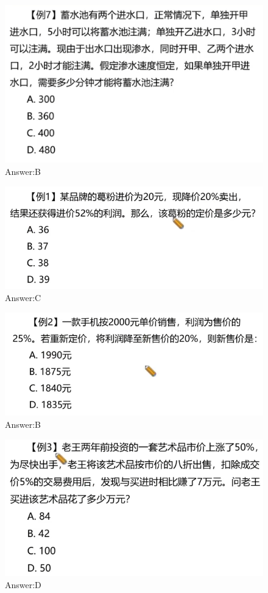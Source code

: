 \documentclass{article}
\numberwithin{equation}{section}						%
\numberwithin{figure}{section}							%
\begin{document}
\begin{sloppypar}
\begin{figure}[H]
     \centering
     \includegraphics[width=0.6\linewidth]{274.png}
		\caption{Answer:B}
\end{figure}

\begin{figure}[H]
     \centering
     \includegraphics[width=0.6\linewidth]{275.png}
		\caption{Answer:C}
\end{figure}


\begin{figure}[H]
     \centering
     \includegraphics[width=0.6\linewidth]{276.png}
		\caption{Answer:B}
\end{figure}


\begin{figure}[H]
     \centering
     \includegraphics[width=0.6\linewidth]{277.png}
		\caption{Answer:D}
\end{figure}



\end{sloppypar}
\end{document}
